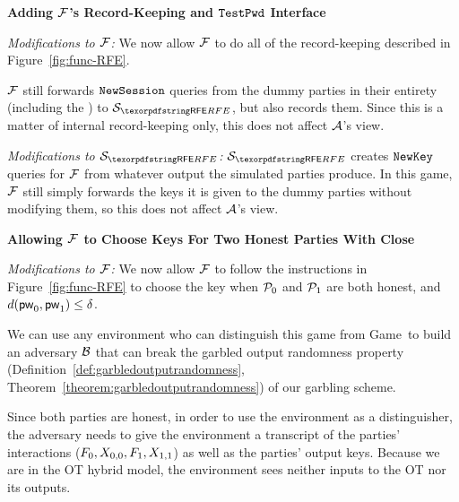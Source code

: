 \begin{games}
\textbf{Adding $\mathcal{F}$'s Record-Keeping and $\texttt{TestPwd}$ Interface}


\textit{Modifications to $\mathcal{F}$:}
We now allow $\mathcal{F}$ to do all of the record-keeping described in Figure~\ref{fig:func-RFE}.

$\mathcal{F}$ still forwards $\texttt{NewSession}$ queries from the dummy parties in their entirety (including the \password) to $\SimYGCRFE$, but also records them.
Since this is a matter of internal record-keeping only, this does not affect $\mathcal{A}$'s view.

\textit{Modifications to $\SimYGCRFE$:}
$\SimYGCRFE$ creates $\texttt{NewKey}$ queries for $\mathcal{F}$ from whatever output the simulated parties produce. 
In this game, $\mathcal{F}$ still simply forwards the keys it is given to the dummy parties without modifying them, so this does not affect $\mathcal{A}$'s view.

\textbf{Allowing $\mathcal{F}$ to Choose Keys For Two Honest Parties With Close \Passwords}

\textit{Modifications to $\mathcal{F}$:}
We now allow $\mathcal{F}$ to follow the instructions in Figure~\ref{fig:func-RFE} to choose the key when $\mathcal{P}_{0}$ and $\mathcal{P}_{1}$ are both honest, and $d(\mathsf{pw}_{0}, \mathsf{pw}_{1}) \leq \delta$.

We can use any environment who can distinguish this game from Game~\previousgame to build an adversary $\mathcal{B}$ that can break the garbled output randomness property (Definition~\ref{def:garbledoutputrandomness}, Theorem~\ref{theorem:garbledoutputrandomness}) of our garbling scheme.

Since both parties are honest, in order to use the environment as a distinguisher, the adversary needs to give the environment a transcript of the parties' interactions ($F_{0}, X_{0,0}, F_{1}, X_{1,1}$) as well as the parties' output keys.
Because we are in the OT hybrid model, the environment sees neither inputs to the OT nor its outputs.


\end{games}
